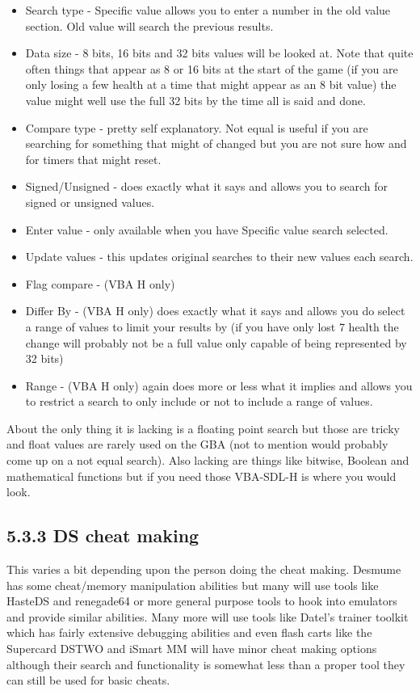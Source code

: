 \documentclass[
]{book}
\providecommand{\tightlist}{%
  \setlength{\itemsep}{0pt}\setlength{\parskip}{0pt}}
\begin{document}
\begin{itemize}
\tightlist
\item
  Search type - Specific value allows you to enter a number in the old value section. Old value will search the previous results.
\item
  Data size - 8 bits, 16 bits and 32 bits values will be looked at. Note that quite often things that appear as 8 or 16 bits at the start of the game (if you are only losing a few health at a time that might appear as an 8 bit value) the value might well use the full 32 bits by the time all is said and done.
\item
  Compare type - pretty self explanatory. Not equal is useful if you are searching for something that might of changed but you are not sure how and for timers that might reset.
\item
  Signed/Unsigned - does exactly what it says and allows you to search for signed or unsigned values.
\item
  Enter value - only available when you have Specific value search selected.
\item
  Update values - this updates original searches to their new values each search.
\item
  Flag compare - (VBA H only)
\item
  Differ By - (VBA H only) does exactly what it says and allows you do select a range of values to limit your results by (if you have only lost 7 health the change will probably not be a full value only capable of being represented by 32 bits)
\item
  Range - (VBA H only) again does more or less what it implies and allows you to restrict a search to only include or not to include a range of values.
\end{itemize}

About the only thing it is lacking is a floating point search but those are tricky and float values are rarely used on the GBA (not to mention would probably come up on a not equal search). Also lacking are things like bitwise, Boolean and mathematical functions but if you need those VBA-SDL-H is where you would look.

\hypertarget{ds-cheat-making}{%
\subsection{5.3.3 DS cheat making}\label{ds-cheat-making}}

This varies a bit depending upon the person doing the cheat making. Desmume has some cheat/memory manipulation abilities but many will use tools like HasteDS and renegade64 or more general purpose tools to hook into emulators and provide similar abilities. Many more will use tools like Datel's trainer toolkit which has fairly extensive debugging abilities and even flash carts like the Supercard DSTWO and iSmart MM will have minor cheat making options although their search and functionality is somewhat less than a proper tool they can still be used for basic cheats.
\end{document}
